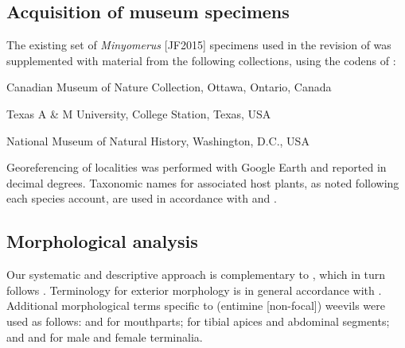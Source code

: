 \documentclass[fleqn,10pt,lineno]{wlpeerj} %
\begin{document}
	\subsection*{Acquisition of museum specimens}\label{ssec:museum} 
		The existing set of \textit{Minyomerus} [JF2015] specimens used in the revision of \citet{jansen2015} was supplemented with material from the following collections, using the codens of \citet{arnett1993}:
		
		\begin{description}[itemsep=-1ex]
			\item[\texttt{CMNC}] Canadian Museum of Nature Collection, Ottawa, Ontario, Canada
			\item[\texttt{TAMU}] Texas A \& M University, College Station, Texas, USA
			\item[\texttt{USNM}] National Museum of Natural History, Washington, D.C., USA
		\end{description}

			Georeferencing of localities was performed with Google Earth \citep{google2018} and reported in decimal degrees.
		Taxonomic names for associated host plants, as noted following each species account, are used in accordance with \citet{munz1973} and \citet{seinet2018}.
		
	\subsection*{Morphological analysis}\label{ssec:morph} 
		Our systematic and descriptive approach is complementary to \citet{jansen2015}, which in turn follows \citet{franz2010a, franz2010b, franz2012}.
		Terminology for exterior morphology is in general accordance with \citet{torre1989}.
		Additional morphological terms specific to (entimine [non-focal]) weevils were used as follows:
			\citet{ting1936} and \citet{morimoto2003} for mouthparts;
			\citet{thompson1992} for tibial apices and abdominal segments;
			and \citet{oberprieler2014} and \citet{howden1995} for male and female terminalia.
		
\end{document}
